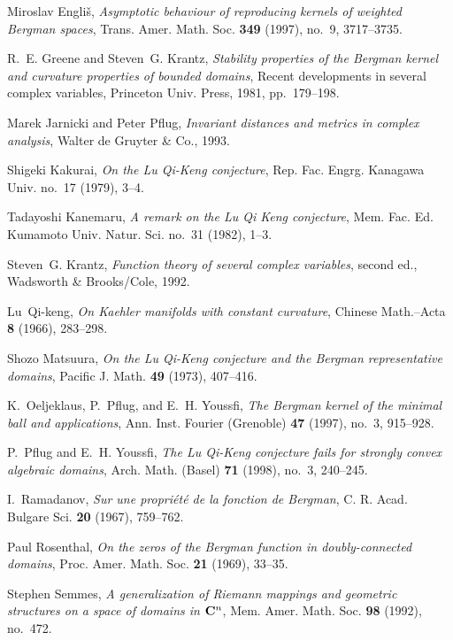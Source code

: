 \documentclass[12pt]{amsart}
\theoremstyle{definition}
\begin{document}
\begin{thebibliography}{10}
 Miroslav Engli{\v{s}}, \emph{Asymptotic
behaviour of reproducing kernels of weighted {B}ergman spaces},
Trans. Amer. Math. Soc. \textbf{349} (1997), no.~9, 3717--3735.

 R.~E. Greene and Steven~G. Krantz,
  \emph{Stability properties of the {B}ergman kernel and
    curvature properties of bounded domains}, Recent developments
  in several complex variables, Princeton Univ. Press, 1981,
  pp.~179--198.
  
 Marek Jarnicki and Peter Pflug,
  \emph{Invariant distances and metrics in complex analysis},
  Walter de Gruyter \& Co., 1993.

Shigeki Kakurai, \emph{On the Lu Qi-Keng conjecture},
Rep. Fac. Engrg. Kanagawa Univ. no.~17 (1979), 3--4.

Tadayoshi Kanemaru,  
\emph{A remark on the Lu Qi Keng conjecture},
Mem. Fac. Ed. Kumamoto Univ. Natur. Sci. no.~31 (1982), 1--3. 

 Steven~G. Krantz, \emph{Function theory of
several complex variables}, second ed., Wadsworth \& Brooks/Cole,
1992.

 Lu~Qi-keng, \emph{On {K}aehler manifolds with
constant curvature}, Chinese Math.--Acta \textbf{8} (1966),
283--298.

 Shozo Matsuura, \emph{On the {L}u {Q}i-{K}eng
conjecture and the {B}ergman representative domains}, Pacific
J. Math. \textbf{49} (1973), 407--416.

 K.~Oeljeklaus, P.~Pflug, and E.~H. Youssfi,
\emph{The {B}ergman kernel of the minimal ball and applications},
Ann. Inst. Fourier (Grenoble) \textbf{47} (1997), no.~3,
915--928.

 P.~Pflug and E.~H. Youssfi, \emph{The {L}u
{Q}i-{K}eng conjecture fails for strongly convex algebraic
domains}, Arch. Math. (Basel) \textbf{71} (1998), no.~3,
240--245.

 I.~Ramadanov, \emph{Sur une propri\'et\'e de
la fonction de {B}ergman}, C. R.  Acad. Bulgare Sci. \textbf{20}
(1967), 759--762.

 Paul Rosenthal, \emph{On the zeros of the
{B}ergman function in doubly-connected domains},
Proc. Amer. Math. Soc. \textbf{21} (1969), 33--35.

 Stephen Semmes, \emph{A generalization of
{R}iemann mappings and geometric structures on a space of domains
in $\mathbf{C}\sp n$}, Mem. Amer. Math. Soc.  \textbf{98} (1992),
no.~472.


\end{thebibliography}
\end{document}
